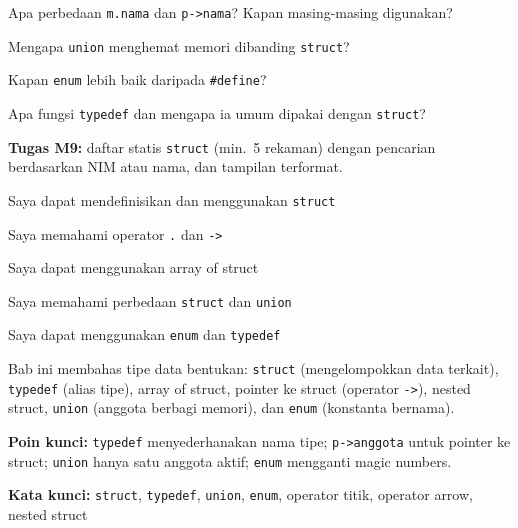\documentclass[../main.tex]{subfiles}
\begin{document}


\begin{latihan}
  \item Apa perbedaan \texttt{m.nama} dan \texttt{p->nama}? Kapan masing-masing digunakan?
  \item Mengapa \texttt{union} menghemat memori dibanding \texttt{struct}?
  \item Kapan \texttt{enum} lebih baik daripada \texttt{\#define}?
  \item Apa fungsi \texttt{typedef} dan mengapa ia umum dipakai dengan \texttt{struct}?
\end{latihan}

\begin{asesmen}
\textbf{Tugas M9:} daftar statis \texttt{struct} (min.\ 5 rekaman) dengan pencarian berdasarkan NIM atau nama, dan tampilan terformat.
\end{asesmen}

\begin{checklist}
  \item Saya dapat mendefinisikan dan menggunakan \texttt{struct}
  \item Saya memahami operator \texttt{.} dan \texttt{->}
  \item Saya dapat menggunakan array of struct
  \item Saya memahami perbedaan \texttt{struct} dan \texttt{union}
  \item Saya dapat menggunakan \texttt{enum} dan \texttt{typedef}
\end{checklist}

\begin{rangkuman}
Bab ini membahas tipe data bentukan: \texttt{struct} (mengelompokkan data terkait), \texttt{typedef} (alias tipe), array of struct, pointer ke struct (operator \texttt{->}), nested struct, \texttt{union} (anggota berbagi memori), dan \texttt{enum} (konstanta bernama).

\textbf{Poin kunci:} \texttt{typedef} menyederhanakan nama tipe; \texttt{p->anggota} untuk pointer ke struct; \texttt{union} hanya satu anggota aktif; \texttt{enum} mengganti magic numbers.

\textbf{Kata kunci:} \texttt{struct}, \texttt{typedef}, \texttt{union}, \texttt{enum}, operator titik, operator arrow, nested struct
\end{rangkuman}
\end{document}
